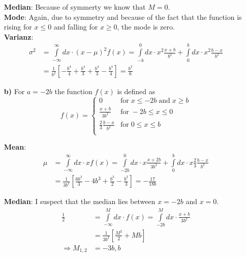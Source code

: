 \documentclass[10pt]{article}
\newenvironment{myfont}{\fontfamily{put}\selectfont}{\par}
\begin{document}
\begin{myfont}
\begin{itemize}
  \noindent \textbf{Median}: Because of symmerty we know that $M = 0$. \\

  \noindent \textbf{Mode}: Again, due to symmetry and because of the fact that the function is rising for $x \leq 0$ and falling for $x \geq 0$, the mode is zero. \\

  \noindent \textbf{Varianz}:
  \begin{align*}
  \sigma^{2} & = \int\limits_{-\infty}^{\infty}dx \cdot (x - \mu)^{2}f(x) = \int\limits_{-b}^{0}dx \cdot x^{2}\frac{x+b}{b^{2}} + \int\limits_{0}^{b}dx \cdot x^{2}\frac{b-x}{b^{2}} \\
             & = \frac{1}{b^{2}}\left[-\frac{b^{4}}{4} + \frac{b^{4}}{3} + \frac{b^{4}}{3} - \frac{b^{4}}{4}\right] = \frac{b^{2}}{6}
  \end{align*}

  \item[\textbf{b)}] For $a = -2b$ the function $f(x)$ is defined as
  $$
  f(x) = 
  \begin{cases}
  0                            & \textrm{for}\; x \leq -2b \; \textrm{and}\; x \geq b \\
  \frac{x+b}{3b^{2}}           & \textrm{for}\; -2b \leq x \leq 0 \\
  \frac{2}{3}\frac{b-x}{b^{2}} & \textrm{for}\; 0 \leq x \leq b \\
  \end{cases}
  $$

  \noindent \textbf{Mean}:
  \begin{align*}
  \mu & = \int\limits_{-\infty}^{\infty}dx \cdot xf(x) = \int\limits_{-2b}^{0}dx \cdot x\frac{x+2b}{3b^{2}} + \int\limits_{0}^{b}dx \cdot x\frac{2}{3}\frac{b-x}{b^{2}} \\
      & = \frac{1}{3b^{2}}\left[\frac{6b^{3}}{3} - 4b^{3} + \frac{b^{3}}{2} - \frac{b^{3}}{3}\right] = -\frac{17}{18b}
  \end{align*}


  \noindent \textbf{Median}: I suspect that the median lies between $x = -2b$ and $x = 0$.
  \begin{align*}
  \frac{1}{2}         & = \int\limits_{-\infty}^{M}dx \cdot f(x) = \int\limits_{-2b}^{M}dx \cdot \frac{x+b}{3b^{2}} \\
                      & = \frac{1}{3b^{2}} \left[\frac{M^{2}}{2} + Mb\right] \\
  \Rightarrow M_{1,2} & = -3b, b
  \end{align*}


\end{itemize}
\end{myfont}
\end{document}
